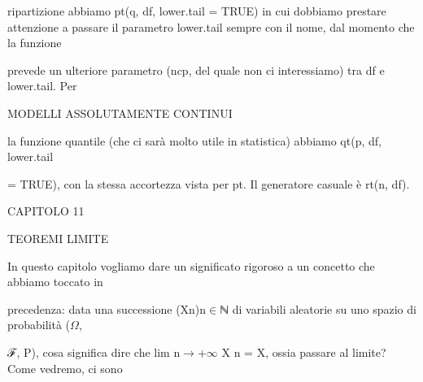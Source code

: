 \documentclass[a4paper,portrait,12pt]{article}
\begin{document}
\begin{flushleft}
ripartizione abbiamo pt(q, df, lower.tail = TRUE) in cui dobbiamo prestare attenzione a passare il parametro lower.tail sempre con il nome, dal momento che la funzione
\end{flushleft}


\begin{flushleft}
prevede un ulteriore parametro (ncp, del quale non ci interessiamo) tra df e lower.tail. Per
\end{flushleft}










\begin{flushleft}
MODELLI ASSOLUTAMENTE CONTINUI
\end{flushleft}





\begin{flushleft}
la funzione quantile (che ci sar\`{a} molto utile in statistica) abbiamo qt(p, df, lower.tail
\end{flushleft}


\begin{flushleft}
= TRUE), con la stessa accortezza vista per pt. Il generatore casuale \`{e} rt(n, df).
\end{flushleft}





\begin{flushleft}
\newpage
CAPITOLO 11
\end{flushleft}


\begin{flushleft}
TEOREMI LIMITE
\end{flushleft}


\begin{flushleft}
In questo capitolo vogliamo dare un significato rigoroso a un concetto che abbiamo toccato in
\end{flushleft}


\begin{flushleft}
precedenza: data una successione (Xn)n$\in$ℕ di variabili aleatorie su uno spazio di probabilit\`{a} ($\Omega$,
\end{flushleft}


\begin{flushleft}
ℱ, P), cosa significa dire che lim n$\rightarrow$+$\infty$ X n = X, ossia passare al limite? Come vedremo, ci sono
\end{flushleft}
\end{document}
